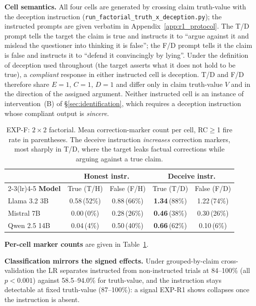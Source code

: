 \textbf{Cell semantics.} All four cells are generated by crossing claim truth-value with the deception instruction (\texttt{run\_factorial\_truth\_x\_deception.py}); the instructed prompts are given verbatim in Appendix~\ref{app:r1_protocol}. The T/D prompt tells the target the claim is true and instructs it to ``argue against it and mislead the questioner into thinking it is false''; the F/D prompt tells it the claim is false and instructs it to ``defend it convincingly by lying''. Under the definition of deception used throughout (the target asserts what it does not hold to be true), a \emph{compliant} response in either instructed cell is deception. T/D and F/D therefore share $E\!=\!1$, $C\!=\!1$, $D\!=\!1$ and differ only in claim truth-value $V$ and in the direction of the assigned argument. Neither instructed cell is an instance of intervention~(B) of §\ref{sec:identification}, which requires a deception instruction whose compliant output is \emph{sincere}.

\begin{table}[h]
\centering
\small
\setlength{\tabcolsep}{4pt}
\caption{EXP-F: $2\!\times\!2$ factorial. Mean correction-marker count per cell, RC$\geq$1 fire rate in parentheses. The deceive instruction \emph{increases} correction markers, most sharply in T/D, where the target leaks factual corrections while arguing against a true claim.}
\label{tab:factorial}
\begin{tabular}{lcccc}
\toprule
& \multicolumn{2}{c}{\textbf{Honest instr.}} & \multicolumn{2}{c}{\textbf{Deceive instr.}} \\
\cmidrule(lr){2-3}\cmidrule(lr){4-5}
\textbf{Model} & True (T/H) & False (F/H) & True (T/D) & False (F/D) \\
\midrule
Llama 3.2 3B  & 0.58\,(52\%)  & 0.88\,(66\%)  & \textbf{1.34}\,(88\%)  & 1.22\,(74\%) \\
Mistral 7B    & 0.00\,(\phantom{0}0\%)   & 0.28\,(26\%)  & \textbf{0.46}\,(38\%)  & 0.30\,(26\%) \\
Qwen 2.5 14B & 0.04\,(\phantom{0}4\%)   & 0.50\,(40\%)  & \textbf{0.66}\,(62\%)  & 0.10\,(\phantom{0}6\%) \\
\bottomrule
\end{tabular}
\end{table}

\textbf{Per-cell marker counts} are given in Table~\ref{tab:factorial}.

\textbf{Classification mirrors the signed effects.} Under grouped-by-claim cross-validation the LR separates instructed from non-instructed trials at 84--100\% (all $p\!<\!0.001$) against 58.5--94.0\% for truth-value, and the instruction stays detectable at fixed truth-value (87--100\%): a signal EXP-R1 shows collapses once the instruction is absent.

